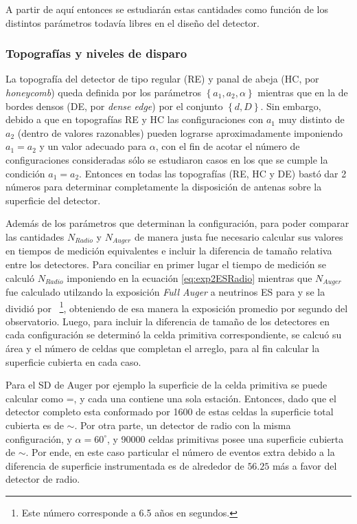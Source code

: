	A partir de aqu\'i entonces se estudiar\'an estas cantidades como funci\'on de los distintos par\'ametros todav\'ia libres en el dise\~no del detector.
	
	\subsubsection{Topograf\'ias y niveles de disparo}
	
	La topograf\'ia del detector de tipo regular (RE) y panal de abeja (HC, por \emph{honeycomb}) queda definida por los par\'ametros $\left\{a_1,a_2,\alpha\right\}$ mientras que en la de bordes densos (DE, por \emph{dense edge}) por el conjunto $\left\{d,D\right\}$.
	Sin embargo, debido a que en topograf\'ias RE y HC las configuraciones con $a_1$ muy distinto de $a_2$ (dentro de valores razonables) pueden lograrse aproximadamente imponiendo $a_1=a_2$ y un valor adecuado para $\alpha$, con el fin de acotar el n\'umero de configuraciones consideradas s\'olo se estudiaron casos en los que se cumple la condici\'on $a_1=a_2$.
	Entonces en todas las topograf\'ias (RE, HC y DE) bast\'o dar 2 n\'umeros para determinar completamente la disposici\'on de antenas sobre la superficie del detector.
	
	Adem\'as de los par\'ametros que determinan la configuraci\'on, para poder comparar las cantidades $N_{Radio}$ y $N_{Auger}$ de manera justa fue necesario calcular sus valores en tiempos de medici\'on equivalentes e incluir la diferencia de tama\~no relativa entre los detectores.
	Para conciliar en primer lugar el tiempo de medici\'on se calcul\'o $N_{Radio}$ imponiendo  en la ecuaci\'on \ref{eq:exp2ESRadio} mientras que $N_{Auger}$ fue calculado utilzando la exposici\'on \emph{Full Auger} a neutrinos ES para  y se la dividi\'o por ~\footnote{Este n\'umero corresponde a 6.5 a\~nos en segundos.}, obteniendo de esa manera la exposici\'on promedio por segundo del observatorio.
	Luego, para incluir la diferencia de tama\~no de los detectores en cada configuraci\'on se determin\'o la celda primitiva correspondiente, se calcu\'o su \'area y el n\'umero de celdas que completan el arreglo, para al fin calcular la superficie cubierta en cada caso.
	
	Para el SD de Auger por ejemplo la superficie de la celda primitiva se puede calcular como =, y cada una contiene una sola estaci\'on.
	Entonces, dado que el detector completo esta conformado por 1600 de estas celdas la superficie total cubierta es de $\sim$.
	Por otra parte, un detector de radio con la misma configuraci\'on,  y $\alpha=60^\circ$, y 90000 celdas primitivas posee una superficie cubierta de $\sim$.
	Por ende, en este caso particular el n\'umero de eventos extra debido a la diferencia de superficie instrumentada es de alrededor de $56.25$ m\'as a favor del detector de radio.
	
